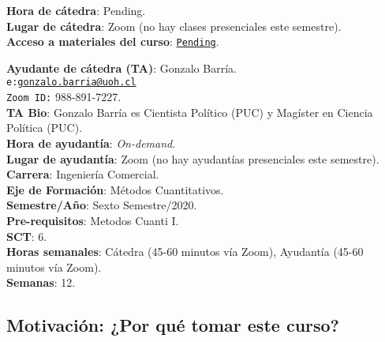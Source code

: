 \documentclass[letterpaper]{article}
\begin{document}
\vspace{5mm}
{\bf Hora de c\'atedra}: {\color{red}Pending.}\\
{\bf Lugar de c\'atedra}: Zoom (no hay clases presenciales este semestre).\\

{\bf Acceso a materiales del curso}: \href{https://ucampus.uoh.cl/uoh/2020/1/ICE3201/1}{\texttt{{\color{red}Pending}}}.

\vspace{5mm}
{\bf Ayudante de c\'atedra (TA)}: Gonzalo Barr\'ia.\\
\texttt{e:}\href{mailto:gonzalo.barria@uoh.cl}{\texttt{gonzalo.barria@uoh.cl}}\\
\texttt{Zoom ID:} 988-891-7227.\\
{\bf TA Bio}: Gonzalo Barr\'ia es Cientista Pol\'itico (PUC) y Mag\'ister en Ciencia Pol\'itica (PUC).\\
{\bf Hora de ayudant\'ia}: \emph{On-demand}.\\
{\bf Lugar de ayudant\'ia}: Zoom (no hay ayudant\'ias presenciales este semestre).\\


\vspace{5mm}
{\bf Carrera}:  Ingenier\'ia Comercial.\\
{\bf Eje de Formaci\'on}: M\'etodos Cuantitativos.\\
{\bf Semestre/A\~no}: Sexto Semestre/2020.\\
{\bf Pre-requisitos}: Metodos Cuanti I.\\
{\bf SCT}: 6.\\
{\bf Horas semanales}: C\'atedra (45-60 minutos v\'ia Zoom), Ayudant\'ia  (45-60 minutos v\'ia Zoom). \\
{\bf Semanas}:  12.\\



\subsection*{Motivaci\'on: ¿Por qu\'e tomar este curso?}
\end{document}

